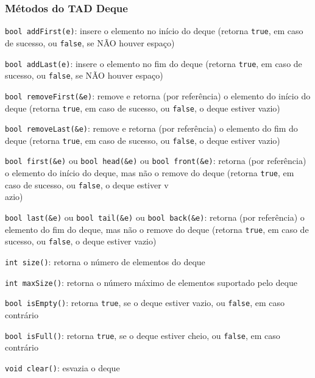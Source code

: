 \documentclass[aspectratio=169]{beamer}
\begin{document}
\begin{frame}\frametitle{Métodos do TAD Deque}
\begin{itemize}
{\scriptsize
	\item \texttt{bool addFirst(e)}: insere o elemento no início do deque (retorna \texttt{true}, em caso de sucesso, ou \texttt{false}, se NÃO houver espaço)\\
	\item \texttt{bool addLast(e)}: insere o elemento no fim do deque (retorna \texttt{true}, em caso de sucesso, ou \texttt{false}, se NÃO houver espaço)\\
	\item \texttt{bool removeFirst(\&e)}: remove e retorna (por referência) o elemento do início do deque (retorna \texttt{true}, em caso de sucesso, ou \texttt{false}, o deque estiver vazio)\\
	\item \texttt{bool removeLast(\&e)}: remove e retorna (por referência) o elemento do fim do deque (retorna \texttt{true}, em caso de sucesso, ou \texttt{false}, o deque estiver vazio)\\
	\item \texttt{bool first(\&e)} ou \texttt{bool head(\&e)} ou \texttt{bool front(\&e)}: retorna (por referência) o elemento do início do deque, mas não o remove do deque (retorna \texttt{true}, em caso de sucesso, ou \texttt{false}, o deque estiver v\\azio)
	\item \texttt{bool last(\&e)} ou \texttt{bool tail(\&e)} ou \texttt{bool back(\&e)}: retorna (por referência) o elemento do fim do deque, mas não o remove do deque (retorna \texttt{true}, em caso de sucesso, ou \texttt{false}, o deque estiver vazio)\\
	\item \texttt{int size()}: retorna o número de elementos do deque\\
	\item \texttt{int maxSize()}: retorna o número máximo de elementos suportado pelo deque\\
	\item \texttt{bool isEmpty()}: retorna \texttt{true}, se o deque estiver vazio, ou \texttt{false}, em caso contrário\\
	\item \texttt{bool isFull()}: retorna \texttt{true}, se o deque estiver cheio, ou \texttt{false}, em caso contrário\\
	\item \texttt{void clear()}: esvazia o deque\\
}
\end{itemize}
\end{frame}
\end{document}
